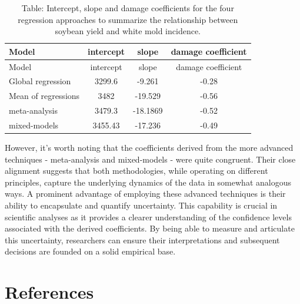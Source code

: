 \documentclass[
  letterpaper,
]{book}
\begin{document}
\begin{longtable}[]{@{}lccc@{}}
\caption{Table: Intercept, slope and damage coefficients for the four
regression approaches to summarize the relationship between soybean
yield and white mold incidence.}\tabularnewline
\toprule\noalign{}
Model & intercept & slope & damage coefficient \\
\midrule\noalign{}
\endfirsthead
\toprule\noalign{}
Model & intercept & slope & damage coefficient \\
\midrule\noalign{}
\endhead
\bottomrule\noalign{}
\endlastfoot
Global regression & 3299.6 & -9.261 & -0.28 \\
Mean of regressions & 3482 & -19.529 & -0.56 \\
meta-analysis & 3479.3 & -18.1869 & -0.52 \\
mixed-models & 3455.43 & -17.236 & -0.49 \\
\end{longtable}

However, it's worth noting that the coefficients derived from the more
advanced techniques - meta-analysis and mixed-models - were quite
congruent. Their close alignment suggests that both methodologies, while
operating on different principles, capture the underlying dynamics of
the data in somewhat analogous ways. A prominent advantage of employing
these advanced techniques is their ability to encapsulate and quantify
uncertainty. This capability is crucial in scientific analyses as it
provides a clearer understanding of the confidence levels associated
with the derived coefficients. By being able to measure and articulate
this uncertainty, researchers can ensure their interpretations and
subsequent decisions are founded on a solid empirical base.


\hypertarget{references}{%
\chapter*{References}\label{references}}

\end{document}
